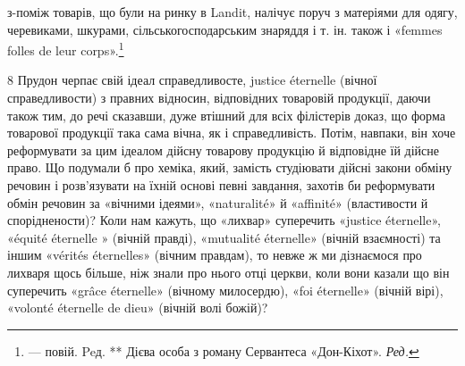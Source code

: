 з-поміж товарів, що були на ринку в Landit, налічує поруч з матеріями
для одягу, черевиками, шкурами, сільськогосподарським знаряддя і т. ін.
також і «femmes folles de leur corps».\footnote*{
— повій. Peд.
** Дієва особа з роману Сервантеса «Дон-Кіхот». \emph{Ред.}
}

8 Прудон черпає свій ідеал справедливосте, justice éternelle (вічної
справедливости) з правних відносин, відповідних товаровій продукції,
даючи також тим, до речі сказавши, дуже втішний для всіх філістерів
доказ, що форма товарової продукції така сама вічна, як і справедливість.
Потім, навпаки, він хоче реформувати за цим ідеалом дійсну товарову
продукцію й відповідне їй дійсне право. Що подумали б про хеміка, який,
замість студіювати дійсні закони обміну речовин і розв’язувати на їхній
основі певні завдання, захотів би реформувати обмін речовин за «вічними
ідеями», «naturalité» й «affinité» (властивости й споріднености)? Коли
нам кажуть, що «лихвар» суперечить «justice éternelle», «équité éternelle
» (вічній правді), «mutualité éternelle» (вічній взаємності) та іншим
«vérités éternelles» (вічним правдам), то невже ж ми дізнаємося про лихваря
щось більше, ніж знали про нього отці церкви, коли вони казали
що він суперечить «grâce éternelle» (вічному милосердю), «foi éternelle»
(вічній вірі), «volonté éternelle de dieu» (вічній волі божій)?
\parbreak{}  %
